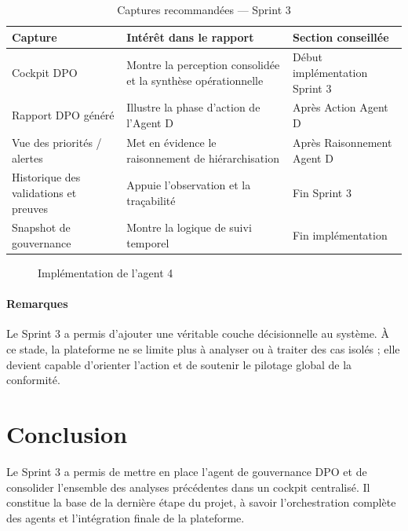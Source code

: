 \documentclass[12pt,a4paper]{report}
\begin{document}
\begin{table}[H]
\centering
\caption{Captures recommandées --- Sprint 3}
\label{tab:captures_sprint3}
\begin{tabularx}{\textwidth}{|p{3.4cm}|X|p{3.2cm}|}
\hline
\textbf{Capture} & \textbf{Intérêt dans le rapport} & \textbf{Section conseillée} \\
\hline
Cockpit DPO & Montre la perception consolidée et la synthèse opérationnelle & Début implémentation Sprint 3 \\
\hline
Rapport DPO généré & Illustre la phase d'action de l'Agent D & Après Action Agent D \\
\hline
Vue des priorités / alertes & Met en évidence le raisonnement de hiérarchisation & Après Raisonnement Agent D \\
\hline
Historique des validations et preuves & Appuie l'observation et la traçabilité & Fin Sprint 3 \\
\hline
Snapshot de gouvernance & Montre la logique de suivi temporel & Fin implémentation \\
\hline
\end{tabularx}
\end{table}

\begin{figure}[H]
\centering
{}
\caption{Implémentation de l'agent 4}
\label{fig:realisation_sprint3}
\end{figure}

\paragraph{Remarques}

Le Sprint 3 a permis d'ajouter une véritable couche décisionnelle au système. À ce stade, la plateforme ne se limite plus à analyser ou à traiter des cas isolés ; elle devient capable d'orienter l'action et de soutenir le pilotage global de la conformité.

\section{Conclusion}

Le Sprint 3 a permis de mettre en place l'agent de gouvernance DPO et de consolider l'ensemble des analyses précédentes dans un cockpit centralisé. Il constitue la base de la dernière étape du projet, à savoir l'orchestration complète des agents et l'intégration finale de la plateforme.
\end{document}
